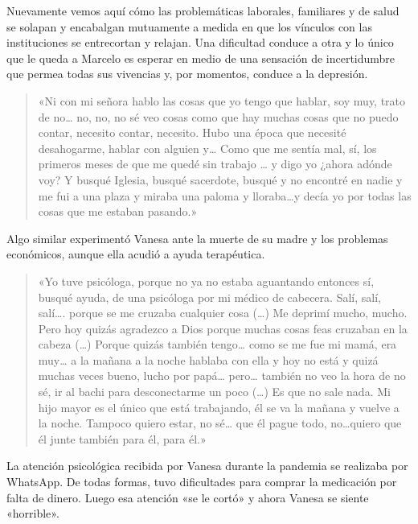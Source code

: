 Nuevamente vemos aquí cómo las problemáticas laborales, familiares y de salud se solapan y encabalgan mutuamente a medida en que los vínculos con las instituciones se entrecortan y relajan. Una dificultad conduce a otra y lo único que le queda a Marcelo es esperar en medio de una sensación de incertidumbre que permea todas sus vivencias y, por momentos, conduce a la depresión.

\begin{quote}
«Ni con mi señora hablo las cosas que yo tengo que hablar, soy muy, trato de no\ldots{} no, no, no sé veo cosas como que hay muchas cosas que no puedo contar, necesito contar, necesito. Hubo una época que necesité desahogarme, hablar con alguien y\ldots{} Como que me sentía mal, sí, los primeros meses de que me quedé sin trabajo \ldots{} y digo yo ¿ahora adónde voy? Y busqué Iglesia, busqué sacerdote, busqué y no encontré en nadie y me fui a una plaza y miraba una paloma y lloraba\ldots y decía yo por todas las cosas que me estaban pasando.»
\end{quote}

Algo similar experimentó Vanesa ante la muerte de su madre y los problemas económicos, aunque ella acudió a ayuda terapéutica.

\begin{quote}
«Yo tuve psicóloga, porque no ya no estaba aguantando entonces sí, busqué ayuda, de una psicóloga por mi médico de cabecera. Salí, salí, salí\ldots. porque se me cruzaba cualquier cosa (\ldots) Me deprimí mucho, mucho. Pero hoy quizás agradezco a Dios porque muchas cosas feas cruzaban en la cabeza (\ldots) Porque quizás también tengo\ldots{} como se me fue mi mamá, era muy\ldots{} a la mañana a la noche hablaba con ella y hoy no está y quizá muchas veces bueno, lucho por papá\ldots{} pero\ldots{} también no veo la hora de no sé, ir al bachi para desconectarme un poco (\ldots) Es que no sale nada. Mi hijo mayor es el único que está trabajando, él se va la mañana y vuelve a la noche. Tampoco quiero estar, no sé\ldots{} que él pague todo, no\ldots quiero que él junte también para él, para él.»
\end{quote}

La atención psicológica recibida por Vanesa durante la pandemia se realizaba por WhatsApp. De todas formas, tuvo dificultades para comprar la medicación por falta de dinero. Luego esa atención «se le cortó» y ahora Vanesa se siente «horrible».

